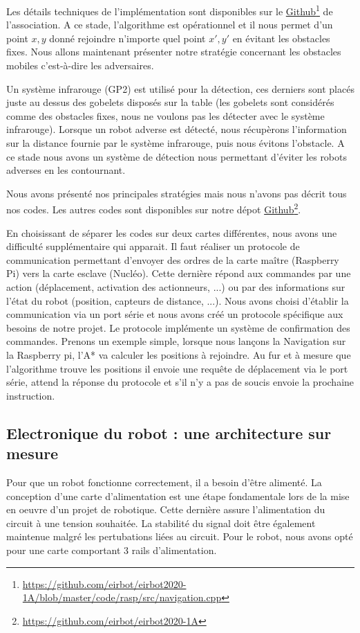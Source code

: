 \documentclass[a4paper,10pt]{article}
\begin{document}
\begin{spacing}{1.5}
Les détails techniques de l'implémentation sont disponibles sur le
\href{https://github.com/eirbot/eirbot2020-1A/blob/master/code/rasp/src/navigation.cpp}{Github}\footnote{\url{https://github.com/eirbot/eirbot2020-1A/blob/master/code/rasp/src/navigation.cpp}}
de l'association.
A ce stade, l'algorithme est opérationnel et il nous permet d'un point $x,y$
donné rejoindre n'importe quel point $x',y'$ en évitant les obstacles fixes.
Nous allons maintenant présenter notre stratégie concernant les obstacles
mobiles c'est-à-dire les adversaires.

Un système infrarouge (GP2) est utilisé pour la détection, ces derniers sont
placés juste au dessus des gobelets disposés sur la table (les gobelets sont
considérés comme des obstacles fixes, nous ne voulons pas les détecter avec le
système infrarouge). Lorsque un robot adverse est détecté, nous récupèrons l'information sur la distance fournie par le
système infrarouge, puis nous évitons l'obstacle. A ce stade nous avons un
système de détection nous permettant d'éviter les robots adverses en les
contournant.

Nous avons présenté nos principales stratégies mais nous n'avons pas décrit tous
nos codes. Les autres codes sont disponibles sur
notre dépot
\href{https://github.com/eirbot/eirbot2020-1A}{Github}\footnote{\url{https://github.com/eirbot/eirbot2020-1A}}.

En choisissant de séparer les codes sur deux cartes différentes, nous avons une
difficulté supplémentaire qui apparait. Il faut réaliser un protocole de
communication permettant d'envoyer des ordres de la carte maître (Raspberry Pi)
vers la carte esclave (Nucléo). Cette dernière répond aux commandes par une
action (déplacement, activation des actionneurs, ...) ou par des informations
sur l'état du robot (position, capteurs de distance, ...). Nous avons choisi
d'établir la communication via un port série et nous avons créé un protocole
spécifique aux besoins de notre projet. Le protocole implémente un système de
confirmation des commandes. Prenons un exemple simple, lorsque nous lançons la
Navigation sur la Raspberry pi, l'A* va calculer les positions à rejoindre. Au
fur et à mesure que l'algorithme trouve les positions il envoie une requête de
déplacement via le port série, attend la réponse du protocole et s'il n'y a pas
de soucis envoie la prochaine instruction.

\subsection*{Electronique du robot : une architecture sur mesure}
Pour que un robot fonctionne correctement, il a besoin d'être alimenté. La
conception d'une carte d'alimentation est une étape fondamentale lors de la mise
en oeuvre d'un projet de robotique. Cette dernière assure l'alimentation du
circuit à une tension souhaitée. La stabilité du signal doit être également
maintenue malgré les pertubations liées au circuit. Pour le robot, nous avons
opté pour une carte comportant 3 rails d'alimentation.


\end{spacing}
\end{document}
